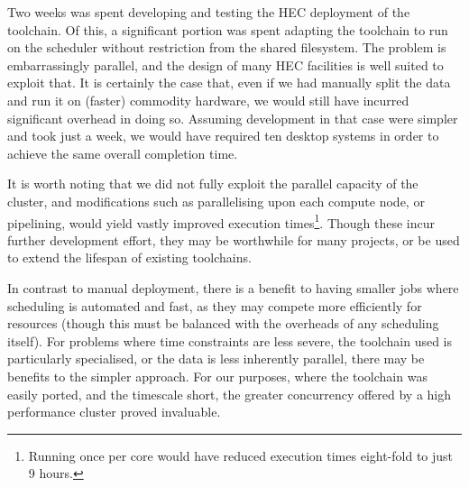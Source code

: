 
Two weeks was spent developing and testing the HEC deployment of the toolchain.  Of this, a significant portion was spent adapting the toolchain to run on the scheduler without restriction from the shared filesystem.
The problem is embarrassingly parallel, and the design of many HEC facilities is well suited to exploit that.  It is certainly the case that, even if we had manually split the data and run it on (faster) commodity hardware, we would still have incurred significant overhead in doing so.  Assuming development in that case were simpler and took just a week, we would have required ten desktop systems in order to achieve the same overall completion time.

It is worth noting that we did not fully exploit the parallel capacity of the cluster, and modifications such as parallelising upon each compute node, or pipelining, would yield vastly improved execution times\footnote{Running once per core would have reduced execution times eight-fold to just 9 hours.}.
Though these incur further development effort, they may be worthwhile for many projects, or be used to extend the lifespan of existing toolchains.

In contrast to manual deployment, there is a benefit to having smaller jobs where scheduling is automated and fast, as they may compete more efficiently for resources (though this must be balanced with the overheads of any scheduling itself).
For problems where time constraints are less severe, the toolchain used is particularly specialised, or the data is less inherently parallel, there may be benefits to the simpler approach.  For our purposes, where
the toolchain was easily ported, and the timescale short, the greater concurrency offered by a high performance cluster proved invaluable.  

